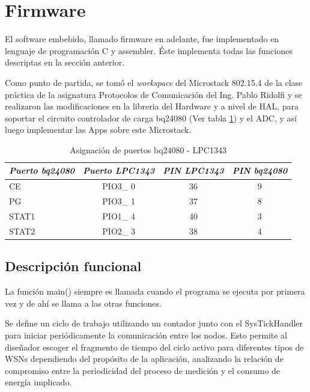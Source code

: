 {\section{Firmware}
\label{sec:firm}
El software embebido, llamado firmware en adelante, fue implementado en lenguaje de programación C y assembler. Éste implementa todas las funciones descriptas en la sección anterior.
 
Como punto de partida, se tomó el \textit{workspace} del Microstack 802.15.4 de la clase práctica de la asignatura Protocolos de Comunicación del Ing. Pablo Ridolfi y se realizaron las modificaciones en la libreria del Hardware y a nivel de HAL, para soportar el circuito controlador de carga bq24080 (Ver tabla \ref{tab:bq}) y el ADC, y así luego implementar las Apps sobre este Microstack.

\begin{table}[ht]
	\centering
	\caption{Asignación de puertos bq24080 - LPC1343}
	\begin{tabular}{@{} l *3c @{}}    \toprule
		\emph{\textbf{Puerto bq24080}} & \emph{\textbf{Puerto LPC1343}} & \emph{\textbf{PIN LPC1343}} & \emph{\textbf{PIN bq24080}}\\
		\midrule
		CE &  PIO3\_ 0 & 36 & 9	\\	
		PG	&  PIO3\_ 1 & 37 & 8\\
		STAT1 &  PIO1\_ 4 & 40 & 3\\
		STAT2 &  PIO2\_ 3 & 38 & 4\\
		\bottomrule
		\hline
	\end{tabular}
	\label{tab:bq}
\end{table}

\subsection{Descripción funcional}
\label{subsec:func} 
La función main() siempre es llamada cuando el programa se ejecuta por primera vez y de ahí se llama a las otras funciones.

Se define un ciclo de trabajo utilizando un contador junto con el SysTickHandler para iniciar periódicamente la comunicación entre los nodos. Esto permite al diseñador escoger el fragmento de tiempo del ciclo activo para diferentes tipos de WSNs dependiendo del propósito de la aplicación, analizando la relación de compromiso entre la periodicidad del proceso de medición y el consumo de energía implicado.

}
